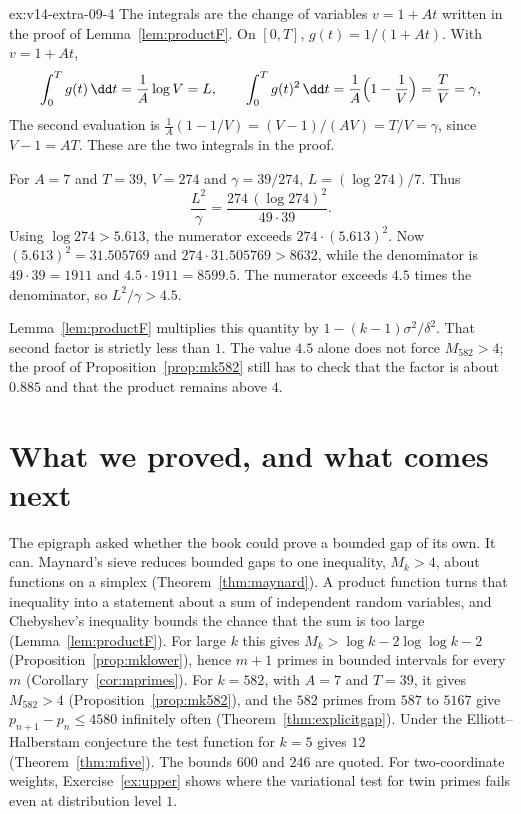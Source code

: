 \begin{solution}{ex:v14-extra-09-4}
\idea The integrals are the change of variables $v=1+At$ written in the proof of Lemma~\ref{lem:productF}.
\writeup On $[0,T]$, $g(t)=1/(1+At)$. With $v=1+At$,
\[
\int_0^T g(t)\,\dd t=\frac1A\log V=L,\qquad\int_0^T g(t)^2\,\dd t=\frac1A\Bigl(1-\frac1V\Bigr)=\frac{T}V=\gamma,
\]
The second evaluation is $\frac1A(1-1/V)=(V-1)/(AV)=T/V=\gamma$, since $V-1=AT$. These are the two integrals in the proof.

For $A=7$ and $T=39$, $V=274$ and $\gamma=39/274$, $L=(\log274)/7$. Thus
\[
\frac{L^2}\gamma=\frac{274\,(\log274)^2}{49\cdot39}.
\]
Using $\log274>5.613$, the numerator exceeds $274\cdot(5.613)^2$. Now $(5.613)^2=31.505769$ and $274\cdot31.505769>8632$, while the denominator is $49\cdot39=1911$ and $4.5\cdot1911=8599.5$. The numerator exceeds $4.5$ times the denominator, so $L^2/\gamma>4.5$.

Lemma~\ref{lem:productF} multiplies this quantity by $1-(k-1)\sigma^2/\delta^2$. That second factor is strictly less than $1$. The value $4.5$ alone does not force $M_{582}>4$; the proof of Proposition~\ref{prop:mk582} still has to check that the factor is about $0.885$ and that the product remains above $4$.
\end{solution}

\section{What we proved, and what comes next}

The epigraph asked whether the book could prove a bounded gap of its own. It can. Maynard's sieve reduces bounded gaps to one inequality, $M_k>4$, about functions on a simplex (Theorem~\ref{thm:maynard}). A product function turns that inequality into a statement about a sum of independent random variables, and Chebyshev's inequality bounds the chance that the sum is too large (Lemma~\ref{lem:productF}). For large $k$ this gives $M_k>\log k-2\log\log k-2$ (Proposition~\ref{prop:mklower}), hence $m+1$ primes in bounded intervals for every $m$ (Corollary~\ref{cor:mprimes}). For $k=582$, with $A=7$ and $T=39$, it gives $M_{582}>4$ (Proposition~\ref{prop:mk582}), and the $582$ primes from $587$ to $5167$ give $p_{n+1}-p_n\le4580$ infinitely often (Theorem~\ref{thm:explicitgap}). Under the Elliott--Halberstam conjecture the test function for $k=5$ gives $12$ (Theorem~\ref{thm:mfive}). The bounds $600$ and $246$ are quoted. For two-coordinate weights, Exercise~\ref{ex:upper} shows where the variational test for twin primes fails even at distribution level $1$.

